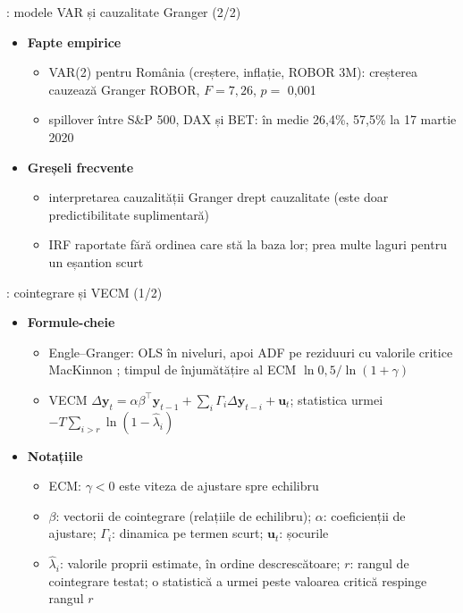 \begin{frame}{: modele VAR și cauzalitate Granger (2/2)}
\itemsize{\footnotesize}
\begin{itemize}
    \item \textbf{Fapte empirice}
    \begin{itemize}
        \item VAR(2) pentru România (creștere, inflație, ROBOR 3M): creșterea cauzează Granger ROBOR, $F = 7{,}26$, $p =$ 0{,}001
        \item spillover între S\&P 500, DAX și BET: în medie 26{,}4\%, 57{,}5\% la 17 martie 2020
    \end{itemize}
    \item \textbf{Greșeli frecvente}
    \begin{itemize}
        \item interpretarea cauzalității Granger drept cauzalitate (este doar predictibilitate suplimentară)
        \item IRF raportate fără ordinea care stă la baza lor; prea multe laguri pentru un eșantion scurt
    \end{itemize}
\end{itemize}
\end{frame}

\begin{frame}{: cointegrare și VECM (1/2)}
\itemsize{\footnotesize}
\begin{itemize}
    \item \textbf{Formule-cheie}
    \begin{itemize}
        \item Engle--Granger: OLS în niveluri, apoi ADF pe reziduuri cu valorile critice MacKinnon ; timpul de înjumătățire al ECM $\ln 0{,}5/\ln(1 + \gamma)$
        \item VECM $\Delta\mathbf y_t = \alpha\beta^\top\mathbf y_{t-1} + \sum_i\Gamma_i\Delta\mathbf y_{t-i} + \mathbf u_t$; statistica urmei $-T\sum_{i>r}\ln(1 - \hat\lambda_i)$ 
    \end{itemize}
    \item \textbf{Notațiile}
    \begin{itemize}
        \item ECM: $\gamma < 0$ este viteza de ajustare spre echilibru
        \item $\beta$: vectorii de cointegrare (relațiile de echilibru); $\alpha$: coeficienții de ajustare; $\Gamma_i$: dinamica pe termen scurt; $\mathbf u_t$: șocurile
        \item $\hat\lambda_i$: valorile proprii estimate, în ordine descrescătoare; $r$: rangul de cointegrare testat; o statistică a urmei peste valoarea critică respinge rangul $r$
    \end{itemize}
\end{itemize}
\end{frame}

